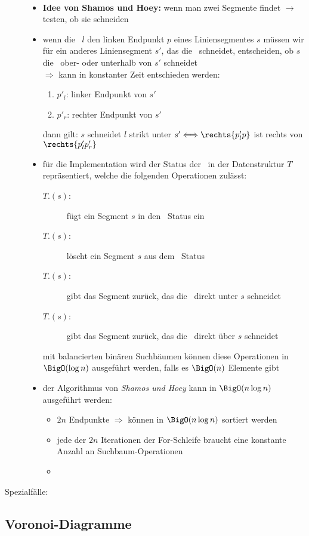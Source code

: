 \begin{description}
	\item[]\ \\\up\up
		\begin{itemize}
			\item \textbf{Idee von Shamos und Hoey:} wenn man zwei
			Segmente findet $\rightarrow$ testen, ob sie schneiden
			\item wenn die \sweep~$l$ den linken Endpunkt $p$ eines Liniensegmentes $s$ müssen wir für ein anderes Liniensegment $s'$, das die \sweep~schneidet, entscheiden, ob $s$ die \sweep~ober- oder unterhalb von $s'$ schneidet\\
			$\Rightarrow$ kann in konstanter Zeit entschieden werden:
				\begin{enumerate}
					\item $p'_l$: linker Endpunkt von $s'$
					\item $p'_r$: rechter Endpunkt von $s'$
				\end{enumerate}
				dann gilt: $s$ schneidet $l$ strikt unter $s' \Longleftrightarrow \rechts{p'_lp}$ ist rechts von $\rechts{p'_lp'_r}$
			\item für die Implementation wird der Status der \sweep~in der Datenstruktur $T$ repräsentiert, welche die folgenden Operationen zulässt:
				\begin{description}
					\item[$T$.\insert$(s)$:] fügt ein Segment $s$ in den \sweep~Status ein
					\item[$T$.\delete$(s)$:] löscht ein Segment $s$ aus dem \sweep~Status
					\item[$T$.\pred$(s)$:] gibt das Segment zurück, das die \sweep~direkt unter $s$ schneidet
					\item[$T$.\succ$(s)$:] gibt das Segment zurück, das die \sweep~direkt über $s$ schneidet
				\end{description}
			mit balancierten binären Suchbäumen können diese Operationen in $\BigO(\log n)$ ausgeführt werden, falls es $\BigO(n)$ Elemente gibt
			\item der Algorithmus von \textit{Shamos und Hoey} kann in $\BigO(n\log n)$ ausgeführt werden:
				\begin{itemize}
					\item $2n$ Endpunkte $\Rightarrow$ können in $\BigO(n\log n)$ sortiert werden
					\item jede der $2n$ Iterationen der For-Schleife braucht eine konstante Anzahl an Suchbaum-Operationen
					\item {}
				\end{itemize}
		\end{itemize}
	\item[Spezialfälle:] 
\end{description}
\subsection{Voronoi-Diagramme}